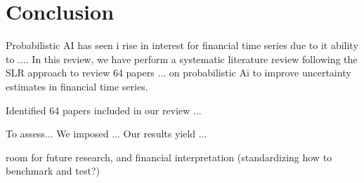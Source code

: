\section{Conclusion}
\label{sec:conclusion}
Probabilistic AI  has seen i rise in interest for financial time series due to it ability to .... In this review, we have perform a systematic literature review following the SLR approach to review 64 papers ... on probabilistic Ai to improve uncertainty estimates in financial time series.

Identified 64 papers included in our review ... 

To assess... We imposed ... Our results yield ... 

room for future research, and financial interpretation (standardizing how to benchmark and test?)



